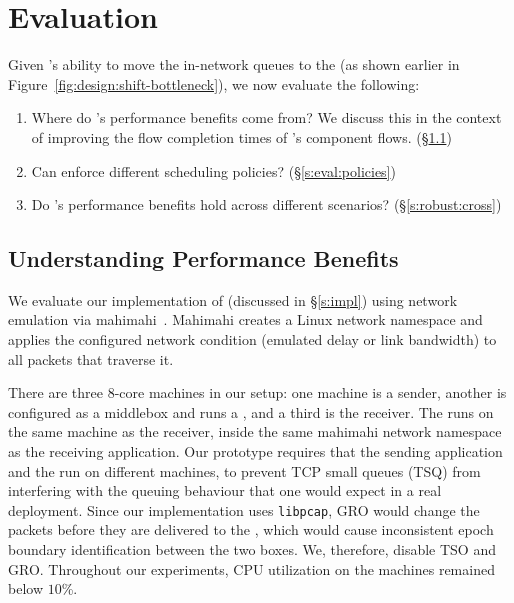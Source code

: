 \section{Evaluation}\label{s:eval}

Given \name's ability to move the in-network queues to the \inbox (as shown earlier in Figure~\ref{fig:design:shift-bottleneck}), we now evaluate the following:
\begin{enumerate}
    \item Where do \name's performance benefits come from? We discuss this in the context of improving the flow completion times of \name's component flows. (\S\ref{s:eval:fct})
    \item Can \name enforce different scheduling policies? (\S\ref{s:eval:policies})
    \item Do \name's performance benefits hold across different scenarios? (\S\ref{s:robust:cross})
\end{enumerate}

\subsection{Understanding Performance Benefits}\label{s:eval:fct}

We evaluate our implementation of \name (discussed in \S\ref{s:impl}) using network emulation via mahimahi~\cite{mahimahi}.
Mahimahi creates a Linux network namespace and applies the configured network condition (emulated delay or link bandwidth) to all packets that traverse it. 

There are three $8$-core machines in our setup: one machine is a sender, another is configured as a middlebox and runs a \inbox, and a third is the receiver. The \outbox runs on the same machine as the receiver, inside the same mahimahi network namespace as the receiving application. 
Our prototype requires that the sending application and the \inbox run on different machines, to prevent TCP small queues (TSQ) from interfering with the queuing behaviour that one would expect in a real deployment. 
Since our \outbox implementation uses \texttt{libpcap}, GRO would change the packets before they are delivered to the \outbox, which would cause inconsistent epoch boundary identification between the two boxes. We, therefore, disable TSO and GRO.
Throughout our experiments, CPU utilization on the machines remained below $10$\%.

